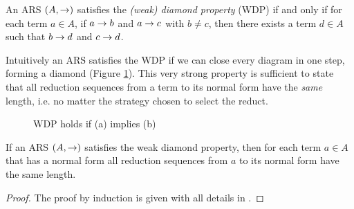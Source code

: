\begin{definition}
	An ARS $(A,\rightarrow)$ satisfies the \emph{(weak) diamond property} (WDP) if and only if for each term $a\in A$, if $a\rightarrow b$ and $a\rightarrow c$ with $b\neq c$, then there exists a term $d\in A$ such that $b\rightarrow d$ and $c\rightarrow d$. 
\end{definition}
Intuitively an ARS satisfies the WDP if we can close every diagram in one step, forming a diamond (Figure \ref{figure:diam}). This very strong property is sufficient to state that all reduction sequences from a term to its normal form have the \emph{same} length, i.e. no matter the strategy chosen to select the reduct.
\begin{figure}
	\centering
	\qquad
	\caption{WDP holds if (a) implies (b)}
	\label{figure:diam}
\end{figure}
\begin{lemma}[]\label{lemma:weak}
	If an ARS $(A,\rightarrow)$ satisfies the weak diamond property, then for each term $a\in A$ that has a normal form all reduction sequences from $a$ to its normal form have the same length.
\end{lemma}
\begin{proof}
	The proof by induction is given with all details in \cite{dal_lago_invariant_2005}.
\end{proof}
